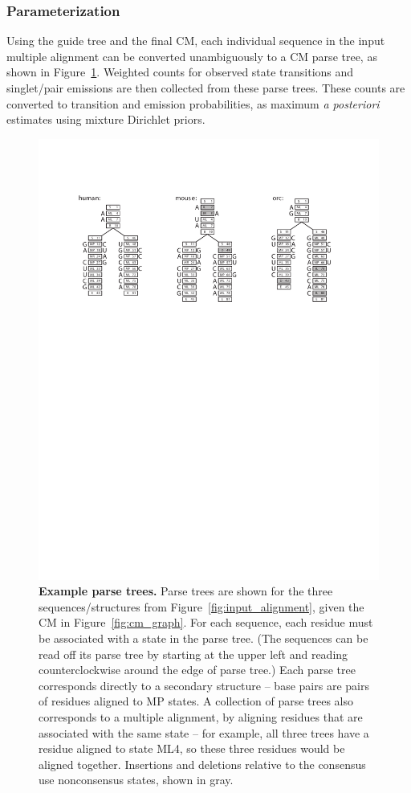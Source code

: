 \subsubsection{Parameterization}

Using the guide tree and the final CM, each individual sequence in the
input multiple alignment can be converted unambiguously to a CM parse
tree, as shown in Figure~\ref{fig:parsetrees}. Weighted counts for
observed state transitions and singlet/pair emissions are then
collected from these parse trees. These counts are converted to
transition and emission probabilities, as maximum \emph{a posteriori}
estimates using mixture Dirichlet priors.

\begin{figure}[t]
\begin{center}
\includegraphics[width=5in]{Figures/parsetrees}
\end{center}
\caption{\small\textbf{Example parse trees.} Parse trees are shown for the
three sequences/structures from Figure~\ref{fig:input_alignment},
given the CM in Figure~\ref{fig:cm_graph}. For each sequence, each
residue must be associated with a state in the parse tree. (The
sequences can be read off its parse tree by starting at the upper left
and reading counterclockwise around the edge of parse tree.) Each
parse tree corresponds directly to a secondary structure -- base pairs
are pairs of residues aligned to MP states. A collection of parse
trees also corresponds to a multiple alignment, by aligning residues
that are associated with the same state -- for example, all three
trees have a residue aligned to state ML4, so these three residues
would be aligned together. Insertions and deletions relative to the
consensus use nonconsensus states, shown in gray.}
\label{fig:parsetrees}
\end{figure}

